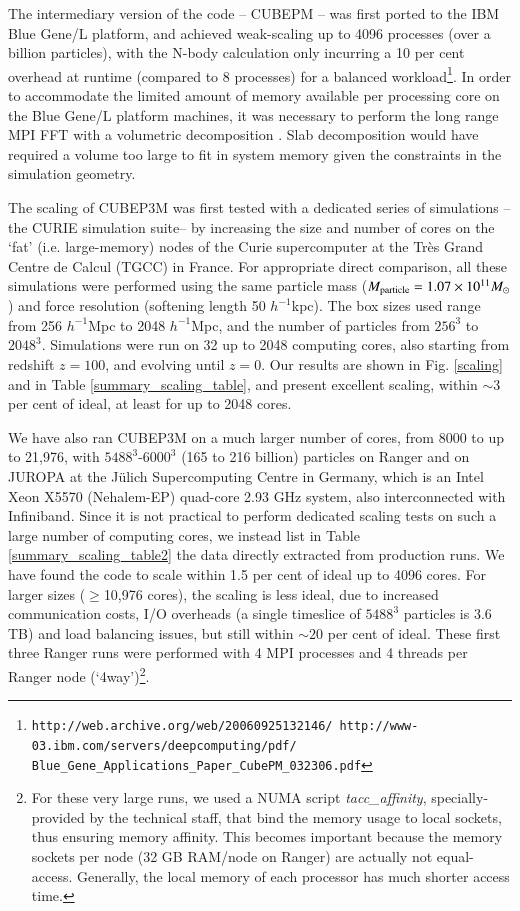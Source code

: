 \documentclass[useAMS,usenatbib]{mn2e}
\begin{document}
 The intermediary version of the code -- {\small CUBEPM} --
was first  ported to the IBM Blue Gene/L platform, and achieved 
weak-scaling up to 4096 processes (over a billion particles), with the N-body calculation only incurring a 10 per cent overhead 
at runtime (compared to 8 processes) for a balanced workload\footnote{\tt http://web.archive.org/web/20060925132146/ http://www-03.ibm.com/servers/deepcomputing/pdf/ Blue\_Gene\_Applications\_Paper\_CubePM\_032306.pdf}.  In order to 
accommodate the limited amount of memory available per processing core on the 
Blue Gene/L platform machines, it was necessary to perform the long range {\small MPI FFT}
with a volumetric decomposition \citep{3DFFT}.
Slab decomposition would have required a volume too large to fit in system 
memory given the constraints in the simulation geometry. 

 
The scaling of {\small CUBEP3M}  was first  tested with a dedicated series 
of simulations -- the CURIE simulation suite-- by increasing the size and number of cores on the `fat' 
(i.e. large-memory) nodes of the  Curie supercomputer at the Tr\`{e}s Grand Centre de Calcul (TGCC) in France. 
 For appropriate direct comparison,
all these simulations were performed using the same particle mass 
($M_{\rm particle}=1.07\times10^{11}M_\odot$) and force resolution 
(softening length 50 $h^{-1}$kpc). The box sizes used range from 256 $h^{-1}$Mpc
to 2048 $h^{-1}$Mpc, and the number of particles from $256^3$ to $2048^3$.
Simulations were run on 32 up to 2048 computing cores, also starting from 
redshift $z=100$, and evolving until $z=0$. Our results are shown in Fig. \ref{scaling} and in Table \ref{summary_scaling_table}, and present excellent scaling, within 
$\sim3$ per cent of ideal, at least for up to 2048 cores. 



We have also ran {\small CUBEP3M} on a much larger number of cores, 
from 8000 to up to 21,976, with $5488^3$-$6000^3$ (165 to 216 billion) 
particles on Ranger and on JUROPA at the J\"ulich Supercomputing Centre in Germany, 
which is an Intel Xeon X5570 
(Nehalem-EP) quad-core 2.93 GHz system, also interconnected with Infiniband.
Since it is not practical to perform dedicated scaling tests on such a large number of
computing cores, we instead list in Table \ref{summary_scaling_table2} 
the data directly extracted from production runs. We have found the 
code to scale within 1.5 per cent of ideal up to 4096 cores. 
For larger sizes ($\ge$10,976 cores), the scaling is less ideal,
due to increased communication 
costs, I/O overheads (a single timeslice of $5488^3$ particles is 3.6 TB)
and load balancing issues, but still within $\sim20$ per cent of ideal. 
These first three Ranger runs were performed 
with 4 {\small MPI} processes and 4 threads per Ranger node (`4way')\footnote{For these very large runs, 
we used a NUMA script {\it tacc\_affinity}, specially-provided by the technical staff, 
that bind the memory usage to local sockets, thus ensuring memory affinity. 
This becomes important because the memory sockets per node 
(32 GB RAM/node on Ranger) are actually not equal-access. Generally, the local 
memory of each processor has much shorter access time.}.
\end{document}
